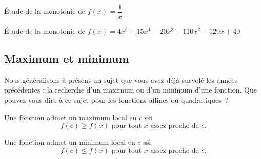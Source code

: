 \begin{exemple}
	\tcblower
	Étude de la monotonie de $f(x)=\dfrac{1}{x}$
	\vspace{6cm}	
\end{exemple}
\begin{exemple}
	\tcblower
	Étude de la monotonie de $f(x)=4x^5-15x^4-20x^3+110x^2-120x+40$
	\vspace{14cm}
\end{exemple}

\subsection{Maximum et minimum}

\begin{discussion}
	\tcblower
Nous généralisons à présent un sujet que vous avez déjà survolé les années précédentes : la recherche d'un maximum ou d'un minimum d'une fonction. Que pouvez-vous dire à ce sujet pour les fonctions affines ou quadratiques~?
\end{discussion}

\begin{definition}
	\tcblower
	Une fonction admet un maximum local en $c$ ssi
	\[f(c)\geq f(x) \text{ pour tout } x \text{ assez proche de } c.\]

Une fonction admet un minimum local en $c$ ssi
	\[f(c)\leq f(x) \text{ pour tout } x \text{ assez proche de } c.\]
\end{definition}

